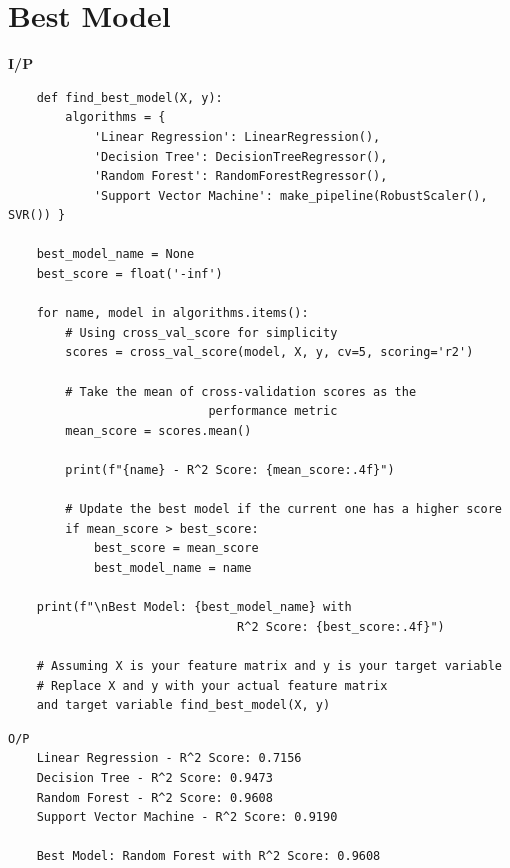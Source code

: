 \section{Best Model}
\noindent
\textbf{I/P} \\[-1.5em]
\begin{verbatim}
    def find_best_model(X, y):
        algorithms = {
            'Linear Regression': LinearRegression(),
            'Decision Tree': DecisionTreeRegressor(),
            'Random Forest': RandomForestRegressor(),
            'Support Vector Machine': make_pipeline(RobustScaler(), SVR()) }

    best_model_name = None
    best_score = float('-inf')

    for name, model in algorithms.items():
        # Using cross_val_score for simplicity
        scores = cross_val_score(model, X, y, cv=5, scoring='r2') 

        # Take the mean of cross-validation scores as the 
                            performance metric
        mean_score = scores.mean()

        print(f"{name} - R^2 Score: {mean_score:.4f}")

        # Update the best model if the current one has a higher score
        if mean_score > best_score:
            best_score = mean_score
            best_model_name = name

    print(f"\nBest Model: {best_model_name} with 
                                R^2 Score: {best_score:.4f}")

    # Assuming X is your feature matrix and y is your target variable
    # Replace X and y with your actual feature matrix 
    and target variable find_best_model(X, y)
\end{verbatim}
\begin{verbatim}
O/P
    Linear Regression - R^2 Score: 0.7156
    Decision Tree - R^2 Score: 0.9473
    Random Forest - R^2 Score: 0.9608
    Support Vector Machine - R^2 Score: 0.9190

    Best Model: Random Forest with R^2 Score: 0.9608
\end{verbatim}

